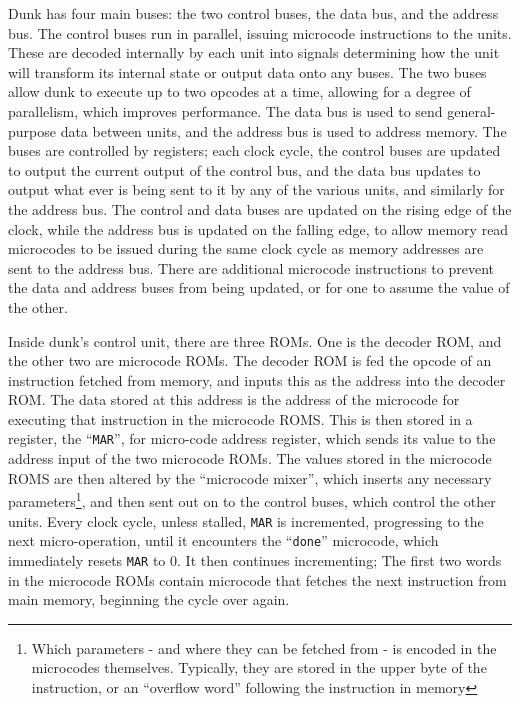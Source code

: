 \documentclass{article}
\begin{document}
Dunk has four main buses: the two control buses, the data bus, and the address bus. The control buses run in parallel, issuing microcode instructions to the units. These are decoded internally by each unit into signals determining how the unit will transform its internal state or output data onto any buses. The two buses allow dunk to execute up to two opcodes at a time, allowing for a degree of parallelism, which improves performance. The data bus is used to send general-purpose data between units, and the address bus is used to address memory. The buses are controlled by registers; each clock cycle, the control buses are updated to output the current output of the control bus, and the data bus updates to output what ever is being sent to it by any of the various units, and similarly for the address bus. The control and data buses are updated on the rising edge of the clock, while the address bus is updated on the falling edge, to allow memory read microcodes to be issued during the same clock cycle as memory addresses are sent to the address bus. There are additional microcode instructions to prevent the data and address buses from being updated, or for one to assume the value of the other.

Inside dunk's control unit, there are three ROMs. One is the decoder ROM, and the other two are microcode ROMs. The decoder ROM is fed the opcode of an instruction fetched from memory, and inputs this as the address into the decoder ROM. The data stored at this address is the address of the microcode for executing that instruction in the microcode ROMS. This is then stored in a register, the ``\Verb|MAR|'', for micro-code address register, which sends its value to the address input of the two microcode ROMs. The values stored in the microcode ROMS are then altered by the ``microcode mixer'', which inserts any necessary parameters\footnote{Which parameters - and where they can be fetched from - is encoded in the microcodes themselves. Typically, they are stored in the upper byte of the instruction, or an ``overflow word'' following the instruction in memory}, and then sent out on to the control buses, which control the other units. Every clock cycle, unless stalled, \Verb|MAR| is incremented, progressing to the next micro-operation, until it encounters the ``\Verb|done|'' microcode, which immediately resets \Verb|MAR| to 0. It then continues incrementing; The first two words in the microcode ROMs contain microcode that fetches the next instruction from main memory, beginning the cycle over again.
\end{document}
